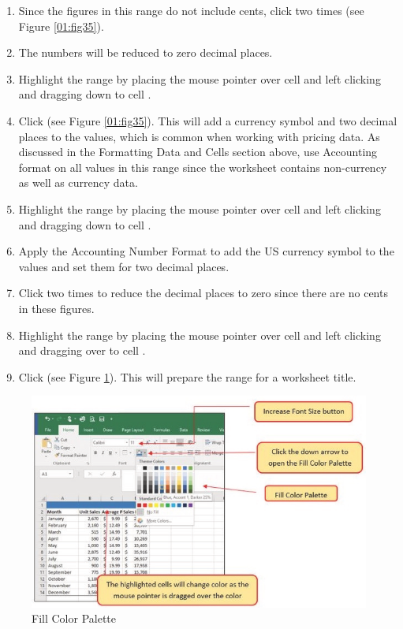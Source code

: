 \begin{enumerate}[resume]
	\item Since the figures in this range do not include cents, click  two times (see Figure \ref{01:fig35}).
	\item The numbers will be reduced to zero decimal places.
	\item Highlight the range  by placing the mouse pointer over cell  and left clicking and dragging down to cell .
	\item Click  (see Figure \ref{01:fig35}). This will add a currency symbol and two decimal places to the values, which is common when working with pricing data. As discussed in the Formatting Data and Cells section above, use Accounting format on all values in this range since the worksheet contains non-currency as well as currency data.
	\item Highlight the range  by placing the mouse pointer over cell  and left clicking and dragging down to cell .
	\item Apply the Accounting Number Format to add the US currency symbol to the values and set them for two decimal places.
	\item Click  two times to reduce the decimal places to zero since there are no cents in these figures.
	\item Highlight the range  by placing the mouse pointer over cell  and left clicking and dragging over to cell .
	\item Click  (see Figure \ref{01:fig36}). This will prepare the range for a worksheet title.
\end{enumerate}

\begin{figure}[H]
	\centering
	\includegraphics[width=\maxwidth{.95\linewidth}]{gfx/ch01_fig36}
	\caption{Fill Color Palette}
	\label{01:fig36}
\end{figure}

